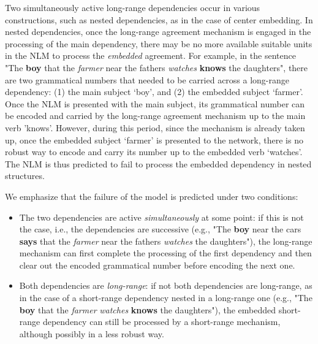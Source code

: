 Two simultaneously active long-range dependencies occur in various constructions, such as nested dependencies, as in the case of center embedding. In nested dependencies, once the long-range agreement mechanism is engaged in the processing of the main dependency, there may be no more available suitable units in the NLM to process the \textit{embedded} agreement. For example, in the sentence "The \textbf{boy} that the \textit{farmer} near the fathers \textit{watches} \textbf{knows} the daughters", there are two grammatical numbers that needed to be carried across a long-range dependency: (1) the main subject `boy', and (2) the embedded subject `farmer'. Once the NLM is presented with the main subject, its grammatical number can be encoded and carried by the long-range agreement mechanism up to the main verb 'knows'. However, during this period, since the mechanism is already taken up, once the embedded subject `farmer' is presented to the network, there is no robust way to encode and carry its number up to the embedded verb `watches'. The NLM is thus predicted to fail to process the embedded dependency in nested structures.

We emphasize that the failure of the model is predicted under two conditions:
\begin{itemize}
	\item The two dependencies are active \textit{simultaneously} at some point: if this is not the case, i.e., the dependencies are successive (e.g., "The \textbf{boy} near the cars \textbf{says} that the \textit{farmer} near the fathers \textit{watches} the daughters"), the long-range mechanism can first complete the processing of the first dependency and then clear out the encoded grammatical number before encoding the next one. 

    \item Both dependencies are \textit{long-range}: if not both dependencies are long-range, as in the case of a short-range dependency nested in a long-range one (e.g., "The \textbf{boy} that the \textit{farmer} \textit{watches} \textbf{knows} the daughters"), the embedded short-range dependency can still be processed by a short-range mechanism, although possibly in a less robust way. 
\end{itemize}

